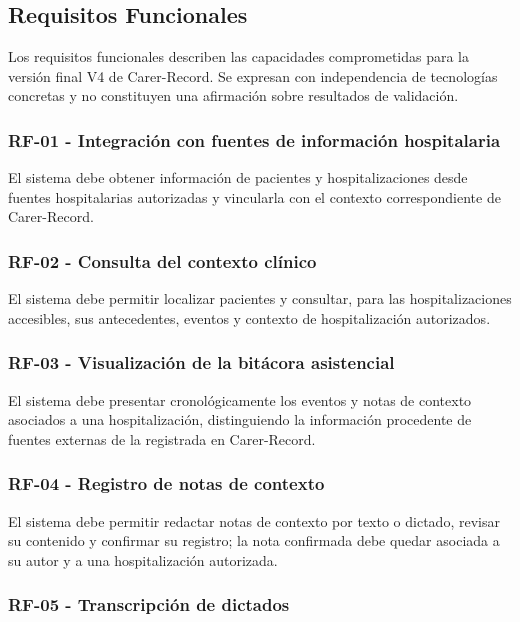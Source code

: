 \subsection{Requisitos Funcionales}

Los requisitos funcionales describen las capacidades comprometidas para la versión final V4 de Carer-Record. Se expresan con independencia de tecnologías concretas y no constituyen una afirmación sobre resultados de validación.

\subsubsection*{\textbf{RF-01} - Integración con fuentes de información hospitalaria}

El sistema debe obtener información de pacientes y hospitalizaciones desde fuentes hospitalarias autorizadas y vincularla con el contexto correspondiente de Carer-Record.

\subsubsection*{\textbf{RF-02} - Consulta del contexto clínico}

El sistema debe permitir localizar pacientes y consultar, para las hospitalizaciones accesibles, sus antecedentes, eventos y contexto de hospitalización autorizados.

\subsubsection*{\textbf{RF-03} - Visualización de la bitácora asistencial}

El sistema debe presentar cronológicamente los eventos y notas de contexto asociados a una hospitalización, distinguiendo la información procedente de fuentes externas de la registrada en Carer-Record.

\subsubsection*{\textbf{RF-04} - Registro de notas de contexto}

El sistema debe permitir redactar notas de contexto por texto o dictado, revisar su contenido y confirmar su registro; la nota confirmada debe quedar asociada a su autor y a una hospitalización autorizada.

\subsubsection*{\textbf{RF-05} - Transcripción de dictados}

